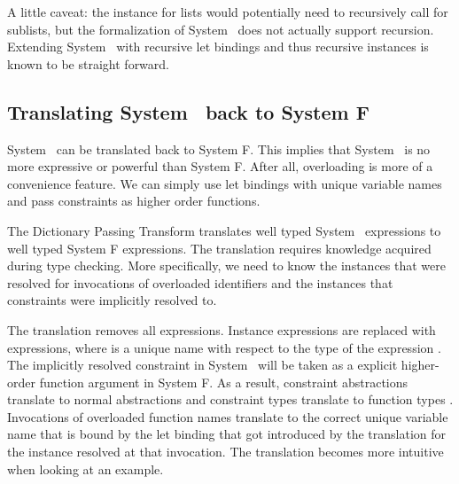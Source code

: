 \noindent A little caveat: the instance for lists would potentially need to recursively call  for sublists, but the formalization of System \Fo\ does not actually support recursion. 
Extending System \Fo\ with recursive let bindings and thus recursive instances is known to be straight forward. 

\subsection{Translating System \Fo\ back to System F}
System \Fo\ can be translated back to System F. 
This implies that System \Fo\ is no more expressive or powerful than System F. 
After all, overloading is more of a convenience feature. 
We can simply use let bindings with unique variable names and pass constraints as higher order functions.

\noindent The Dictionary Passing Transform translates well typed System \Fo\ expressions to well typed System F expressions. 
The translation requires knowledge acquired during type checking. 
More specifically, we need to know the instances that were resolved for invocations of overloaded identifiers and the instances that constraints were implicitly resolved to.

\noindent The translation removes all  expressions. 
Instance expressions  are replaced with  expressions, where  is a unique name with respect to the type  of the expression . 
The implicitly resolved constraint in System \Fo\ will be taken as a explicit higher-order function argument in System F.
As a result, constraint abstractions  translate to normal abstractions  and constraint types  translate to function types . 
Invocations of overloaded function names  translate to the correct unique variable name  that is bound by the let binding that got introduced by the translation for the instance resolved at that invocation. 
The translation becomes more intuitive when looking at an example.

